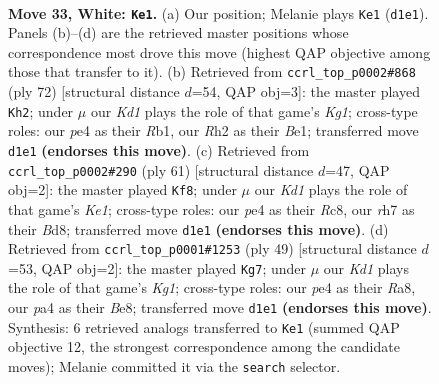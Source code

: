 \documentclass[11pt]{article}
\begin{document}
\clearpage

\begin{figure}[p]\centering
\begin{subfigure}{0.46\textwidth}\centering
\resizebox{\linewidth}{!}{%
\newchessgame
\chessboard[
  setfen={r4k2/5p1r/5n2/8/p3p2p/3p3P/PP3P1R/R1BK4 w - - 6 33},
  showmover=false,
  pgfstyle=straightmove, color=movearrow, markmove={d1-e1}
]}
\caption{}
\end{subfigure}\hfill
\begin{subfigure}{0.46\textwidth}\centering
\resizebox{\linewidth}{!}{%
\newchessgame
\chessboard[
  setfen={1r4k1/5pp1/1n4p1/1P6/2p4P/3r1P2/2R3P1/1R2B1K1 w - - 2 37},
  showmover=false,
  pgfstyle=straightmove, color=movearrow, markmove={g1-h2}
]}
\caption{}
\end{subfigure}
\\[4pt]
\begin{subfigure}{0.46\textwidth}\centering
\resizebox{\linewidth}{!}{%
\newchessgame
\chessboard[
  setfen={2rbk3/p4p2/4p3/4P3/2pP2P1/3r1N2/PP2R1K1/R7 b - - 4 31},
  showmover=false,
  pgfstyle=straightmove, color=movearrow, markmove={e8-f8}
]}
\caption{}
\end{subfigure}\hfill
\begin{subfigure}{0.46\textwidth}\centering
\resizebox{\linewidth}{!}{%
\newchessgame
\chessboard[
  setfen={r3b1k1/2p5/p1N3pp/3r1p2/2R5/2P4P/P4PP1/R5K1 b - - 7 25},
  showmover=false,
  pgfstyle=straightmove, color=movearrow, markmove={g8-g7}
]}
\caption{}
\end{subfigure}
\caption{\textbf{Move 33, White: \texttt{Ke1}.} (a) Our position; Melanie plays \texttt{Ke1} (\texttt{d1e1}). Panels (b)--(d) are the retrieved master positions whose correspondence most drove this move (highest QAP objective among those that transfer to it). (b) Retrieved from \texttt{ccrl\_top\_p0002\#868} (ply 72) [structural distance $d$=54, QAP obj=3]: the master played \texttt{Kh2}; under $\mu$ our \emph{Kd1} plays the role of that game's \emph{Kg1}; cross-type roles: our \emph{p}e4 as their \emph{R}b1, our \emph{R}h2 as their \emph{B}e1; transferred move \texttt{d1e1} \textbf{(endorses this move)}. (c) Retrieved from \texttt{ccrl\_top\_p0002\#290} (ply 61) [structural distance $d$=47, QAP obj=2]: the master played \texttt{Kf8}; under $\mu$ our \emph{Kd1} plays the role of that game's \emph{Ke1}; cross-type roles: our \emph{p}e4 as their \emph{R}c8, our \emph{r}h7 as their \emph{B}d8; transferred move \texttt{d1e1} \textbf{(endorses this move)}. (d) Retrieved from \texttt{ccrl\_top\_p0001\#1253} (ply 49) [structural distance $d$=53, QAP obj=2]: the master played \texttt{Kg7}; under $\mu$ our \emph{Kd1} plays the role of that game's \emph{Kg1}; cross-type roles: our \emph{p}e4 as their \emph{R}a8, our \emph{p}a4 as their \emph{B}e8; transferred move \texttt{d1e1} \textbf{(endorses this move)}. Synthesis: 6 retrieved analogs transferred to \texttt{Ke1} (summed QAP objective 12, the strongest correspondence among the candidate moves); Melanie committed it via the \texttt{search} selector.}
\label{fig:thought-m64}
\end{figure}
\end{document}
